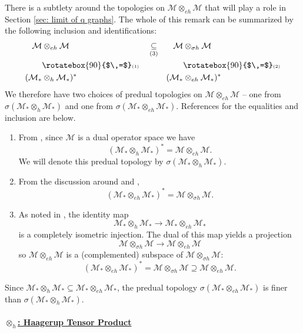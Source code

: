 \documentclass[12pt]{article}
\theoremstyle{definition}
\newenvironment{remark}
  {\pushQED{\qed}\renewcommand{\qedsymbol}{\textcircled{\tiny R}}\remarkx}
  {\popQED\endremarkx}
\newcommand{\mc}[1]{\mathcal{#1}}
\newcommand{\<}{\langle}
\renewcommand{\>}{\rangle}
\renewcommand{\subset}{\subseteq}
\newcommand{\eh}{\otimes_{eh}}
\newcommand{\h}{\otimes_{h}}
\begin{document}
\begin{remark} \label{rmk: predual-tops}
There is a subtlety around the topologies on $\mc M \otimes_{eh} \mc M$ that will play a role in Section \ref{sec: limit of q graphs}. The whole of this remark can be summarized by the following inclusion and identifications:
\begin{align*}
    \mc M &\eh \mc M &  &\underset{(3)}{\subset} & \mc M &\otimes_{\sigma h} \mc M \\
    &\rotatebox{90}{$\,=$} \text{\tiny(1)} & &&&\rotatebox{90}{$\,=$}   \text{\tiny(2)} \\
    (\mc M_* &\otimes_h \mc M_*)^* & & & (\mc M_* &\otimes_{eh} \mc M_*)^*
\end{align*}
We therefore have two choices of predual topologies on $\mc M \eh \mc M$ -- one from $\sigma(\mc M_* \otimes_h \mc M_*)$ and one from $\sigma(\mc M_* \otimes_{eh} \mc M_*)$. References for the equalities and inclusion   are below.

\begin{enumerate}
    \item [(1)] From \cite[Section 3]{blecher-smith-w*h}, since $\mc M$ is a dual operator space we have
    \[
    (\mc M_* \otimes_h \mc M_*)^* = \mc M \otimes_{eh} \mc M.
    \]
    We will denote this predual topology by $\sigma(\mc M_* \otimes_h \mc M_*)$. 
    \item [(2)] From the discussion around \cite[Lemma 5.8]{opsp-hopf} and \cite{normal-haagerup},
    \[
    (\mc M_* \eh \mc M_*)^* = \mc M \otimes_{\sigma h} \mc M.
    \]
    \item [(3)] As noted in \cite[Equation 5.15]{opsp-hopf}, the identity map
    \[
    \mc M_* \otimes_h \mc M_*  \to \mc M_* \eh \mc M_* 
    \]
    is a completely isometric injection. The dual of this map yields a projection
    \[
    \mc M  \otimes_{\sigma h} \mc M  \to \mc M  \eh \mc M 
    \]
    so $\mc M \eh \mc M$ is a (complemented) subspace of $\mc M \otimes_{\sigma h} \mc M$:
    \[
    (\mc M_* \eh \mc M_*)^* = \mc M \otimes_{\sigma h} \mc M \supseteq \mc M \otimes_{eh} \mc M.
    \]
\end{enumerate}

Since $\mc M_* \otimes_h \mc M_* \subset \mc M_* \otimes_{eh} \mc M_*$, the predual topology $\sigma(\mc M_* \otimes_{eh} \mc M_*)$ is finer than $\sigma(\mc M_* \otimes_h \mc M_*)$. 
\end{remark}

\paragraph{\underline{$\h$: Haagerup Tensor Product}}
\end{document}
